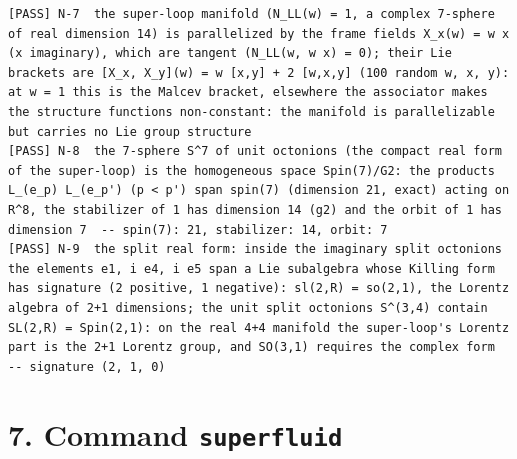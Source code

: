 \documentclass[
  10pt,
]{article}
\begin{document}
\begin{verbatim}
[PASS] N-7  the super-loop manifold (N_LL(w) = 1, a complex 7-sphere of real dimension 14) is parallelized by the frame fields X_x(w) = w x (x imaginary), which are tangent (N_LL(w, w x) = 0); their Lie brackets are [X_x, X_y](w) = w [x,y] + 2 [w,x,y] (100 random w, x, y): at w = 1 this is the Malcev bracket, elsewhere the associator makes the structure functions non-constant: the manifold is parallelizable but carries no Lie group structure
[PASS] N-8  the 7-sphere S^7 of unit octonions (the compact real form of the super-loop) is the homogeneous space Spin(7)/G2: the products L_(e_p) L_(e_p') (p < p') span spin(7) (dimension 21, exact) acting on R^8, the stabilizer of 1 has dimension 14 (g2) and the orbit of 1 has dimension 7  -- spin(7): 21, stabilizer: 14, orbit: 7
[PASS] N-9  the split real form: inside the imaginary split octonions the elements e1, i e4, i e5 span a Lie subalgebra whose Killing form has signature (2 positive, 1 negative): sl(2,R) = so(2,1), the Lorentz algebra of 2+1 dimensions; the unit split octonions S^(3,4) contain SL(2,R) = Spin(2,1): on the real 4+4 manifold the super-loop's Lorentz part is the 2+1 Lorentz group, and SO(3,1) requires the complex form  -- signature (2, 1, 0)
\end{verbatim}

\hypertarget{command-superfluid}{%
\section{\texorpdfstring{7. Command
\texttt{superfluid}}{7. Command superfluid}}\label{command-superfluid}}
\end{document}
